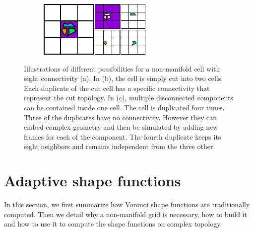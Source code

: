 \begin{figure}[!ht]
\hfill
\begin{subfigure}[b]{0.40\linewidth}
\centering
\includegraphics[width=\linewidth]{images/cutting-mig2015/little_pieces.pdf}
\caption{\label{fig:littlePieces}}
\end{subfigure}
\caption[Frame-based cutting: Non-manifold grid illustration]{\label{fig:nonmanifoldgridillustration}
Illustrations of different possibilities for a non-manifold cell with eight connectivity (a). In (b), the cell is simply cut into two cells. Each duplicate of the cut cell has a specific connectivity that represent the cut topology. In (c), multiple disconnected components can be contained inside one cell. The cell is duplicated four times. Three of the duplicates have no connectivity. However they can embed complex geometry and then be simulated by adding new frames for each of the component. The fourth duplicate keeps its eight neighbors and remains independent from the three other.}
\end{figure}

\section{Adaptive shape functions} \label{sec:adaptivesf}

In this section, we first summarize how Voronoi shape functions are traditionally computed. Then we detail why a non-manifold grid is necessary, how to build it and how to use it to compute the shape functions on complex topology.


